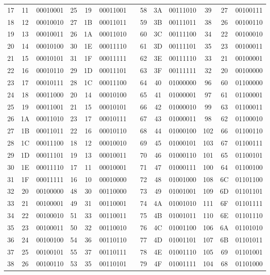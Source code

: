 \begin{table}[p]
{\begin{tabular}{ccccccp{1cm}cccccc}
 17 & 11 & 00010001 & 25 & 19 & 00011001 &  & 58 & 3A & 00111010 & 39 & 27 & 00100111 \\ 
 18 & 12 & 00010010 & 27 & 1B & 00011011 &  & 59 & 3B & 00111011 & 38 & 26 & 00100110 \\ 
 19 & 13 & 00010011 & 26 & 1A & 00011010 &  & 60 & 3C & 00111100 & 34 & 22 & 00100010 \\ 
 20 & 14 & 00010100 & 30 & 1E & 00011110 &  & 61 & 3D & 00111101 & 35 & 23 & 00100011 \\ 
 21 & 15 & 00010101 & 31 & 1F & 00011111 &  & 62 & 3E & 00111110 & 33 & 21 & 00100001 \\ 
 22 & 16 & 00010110 & 29 & 1D & 00011101 &  & 63 & 3F & 00111111 & 32 & 20 & 00100000 \\ 
 23 & 17 & 00010111 & 28 & 1C & 00011100 &  & 64 & 40 & 01000000 & 96 & 60 & 01100000 \\ 
 24 & 18 & 00011000 & 20 & 14 & 00010100 &  & 65 & 41 & 01000001 & 97 & 61 & 01100001 \\ 
 25 & 19 & 00011001 & 21 & 15 & 00010101 &  & 66 & 42 & 01000010 & 99 & 63 & 01100011 \\ 
 26 & 1A & 00011010 & 23 & 17 & 00010111 &  & 67 & 43 & 01000011 & 98 & 62 & 01100010 \\ 
 27 & 1B & 00011011 & 22 & 16 & 00010110 &  & 68 & 44 & 01000100 & 102 & 66 & 01100110 \\ 
 28 & 1C & 00011100 & 18 & 12 & 00010010 &  & 69 & 45 & 01000101 & 103 & 67 & 01100111 \\ 
 29 & 1D & 00011101 & 19 & 13 & 00010011 &  & 70 & 46 & 01000110 & 101 & 65 & 01100101 \\ 
 30 & 1E & 00011110 & 17 & 11 & 00010001 &  & 71 & 47 & 01000111 & 100 & 64 & 01100100 \\ 
 31 & 1F & 00011111 & 16 & 10 & 00010000 &  & 72 & 48 & 01001000 & 108 & 6C & 01101100 \\ 
 32 & 20 & 00100000 & 48 & 30 & 00110000 &  & 73 & 49 & 01001001 & 109 & 6D & 01101101 \\ 
 33 & 21 & 00100001 & 49 & 31 & 00110001 &  & 74 & 4A & 01001010 & 111 & 6F & 01101111 \\ 
 34 & 22 & 00100010 & 51 & 33 & 00110011 &  & 75 & 4B & 01001011 & 110 & 6E & 01101110 \\ 
 35 & 23 & 00100011 & 50 & 32 & 00110010 &  & 76 & 4C & 01001100 & 106 & 6A & 01101010 \\ 
 36 & 24 & 00100100 & 54 & 36 & 00110110 &  & 77 & 4D & 01001101 & 107 & 6B & 01101011 \\ 
 37 & 25 & 00100101 & 55 & 37 & 00110111 &  & 78 & 4E & 01001110 & 105 & 69 & 01101001 \\ 
 38 & 26 & 00100110 & 53 & 35 & 00110101 &  & 79 & 4F & 01001111 & 104 & 68 & 01101000 \\ 
	\bottomrule
 \end{tabular}
}
 \label{tab:graycode}
 \end{table}

